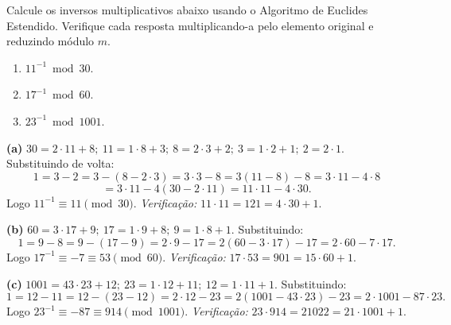 \documentclass[12pt,a4paper]{article}
\begin{document}
\begin{exercicio}
Calcule os inversos multiplicativos abaixo usando o Algoritmo de Euclides Estendido. Verifique cada resposta multiplicando-a pelo elemento original e reduzindo m\'{o}dulo $m$.
\begin{enumerate}[label=(\alph*)]
    \item $11^{-1} \bmod 30$.
    \item $17^{-1} \bmod 60$.
    \item $23^{-1} \bmod 1001$.
\end{enumerate}

\begin{resposta}
\textbf{(a)} $30 = 2 \cdot 11 + 8;\ 11 = 1 \cdot 8 + 3;\ 8 = 2 \cdot 3 + 2;\ 3 = 1 \cdot 2 + 1;\ 2 = 2 \cdot 1$. Substituindo de volta:
\[
1 = 3 - 2 = 3 - (8 - 2 \cdot 3) = 3 \cdot 3 - 8 = 3(11 - 8) - 8 = 3 \cdot 11 - 4 \cdot 8
\]
\[
= 3 \cdot 11 - 4(30 - 2 \cdot 11) = 11 \cdot 11 - 4 \cdot 30.
\]
Logo $11^{-1} \equiv 11 \pmod{30}$. \emph{Verifica\c{c}\~{a}o:} $11 \cdot 11 = 121 = 4 \cdot 30 + 1$. \checkmark

\textbf{(b)} $60 = 3 \cdot 17 + 9;\ 17 = 1 \cdot 9 + 8;\ 9 = 1 \cdot 8 + 1$. Substituindo:
\[
1 = 9 - 8 = 9 - (17 - 9) = 2 \cdot 9 - 17 = 2(60 - 3 \cdot 17) - 17 = 2 \cdot 60 - 7 \cdot 17.
\]
Logo $17^{-1} \equiv -7 \equiv 53 \pmod{60}$. \emph{Verifica\c{c}\~{a}o:} $17 \cdot 53 = 901 = 15 \cdot 60 + 1$. \checkmark

\textbf{(c)} $1001 = 43 \cdot 23 + 12;\ 23 = 1 \cdot 12 + 11;\ 12 = 1 \cdot 11 + 1$. Substituindo:
\[
1 = 12 - 11 = 12 - (23 - 12) = 2 \cdot 12 - 23 = 2(1001 - 43 \cdot 23) - 23 = 2 \cdot 1001 - 87 \cdot 23.
\]
Logo $23^{-1} \equiv -87 \equiv 914 \pmod{1001}$. \emph{Verifica\c{c}\~{a}o:} $23 \cdot 914 = 21022 = 21 \cdot 1001 + 1$. \checkmark
\end{resposta}
\end{exercicio}
\end{document}
